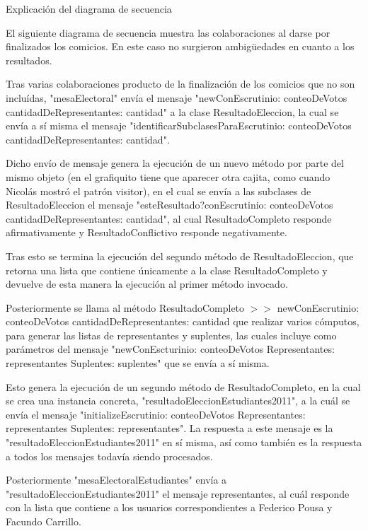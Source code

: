 Explicación del diagrama de secuencia




El siguiente diagrama de secuencia muestra las colaboraciones al darse por finalizados los comicios. En este caso no surgieron ambigüedades en cuanto a los resultados. 


Tras varias colaboraciones producto de la finalización de los comicios que no son incluídas, "mesaElectoral" envía el mensaje 
"newConEscrutinio: conteoDeVotos cantidadDeRepresentantes: cantidad" a la clase ResultadoEleccion, la cual se envía a sí misma el mensaje "identificarSubclasesParaEscrutinio: conteoDeVotos cantidadDeRepresentantes: cantidad". 

Dicho envío de mensaje genera la ejecución de un nuevo método por parte del mismo objeto (en el grafiquito tiene que aparecer otra cajita, como cuando Nicolás mostró el patrón visitor), en el cual se envía a las subclases de ResultadoEleccion el mensaje "esteResultado?conEscrutinio: conteoDeVotos cantidadDeRepresentantes: cantidad", al cual ResultadoCompleto responde afirmativamente y ResultadoConflictivo responde negativamente.

Tras esto se termina la ejecución del segundo método de ResultadoEleccion, que retorna una lista que contiene únicamente a la clase ResultadoCompleto y devuelve de esta manera la ejecución al primer método invocado.

Posteriormente se llama al método ResultadoCompleto $>>$ newConEscrutinio: conteoDeVotos cantidadDeRepresentantes: cantidad
que realizar varios cómputos, para generar las listas de representantes y suplentes, las cuales incluye como parámetros del mensaje "newConEscturinio: conteoDeVotos Representantes: representantes Suplentes: suplentes" que se envía a sí misma.

Esto genera la ejecución de un segundo método de ResultadoCompleto, en la cual se crea una instancia concreta, "resultadoEleccionEstudiantes2011", a la cuál se envía el mensaje "initializeEscrutinio: conteoDeVotos Representantes: representantes Suplentes: representantes". La respuesta a este mensaje es la "resultadoEleccionEstudiantes2011" en sí misma, así como también es la respuesta a todos los mensajes todavía siendo procesados.


Posteriormente "mesaElectoralEstudiantes" envía a "resultadoEleccionEstudiantes2011" el mensaje representantes, al cuál responde con la lista que contiene a los usuarios correspondientes a Federico Pousa y Facundo Carrillo.

